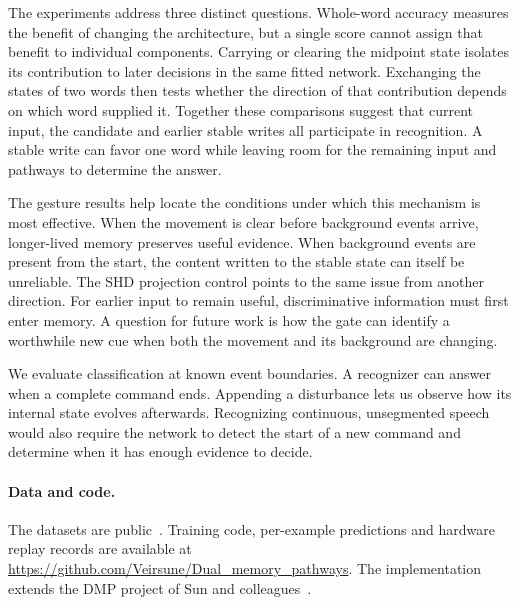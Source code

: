 \documentclass[10pt,twocolumn]{article}
\begin{document}
The experiments address three distinct questions. Whole-word accuracy measures the benefit of changing the architecture, but a single score cannot assign that benefit to individual components. Carrying or clearing the midpoint state isolates its contribution to later decisions in the same fitted network. Exchanging the states of two words then tests whether the direction of that contribution depends on which word supplied it. Together these comparisons suggest that current input, the candidate and earlier stable writes all participate in recognition. A stable write can favor one word while leaving room for the remaining input and pathways to determine the answer.

The gesture results help locate the conditions under which this mechanism is most effective. When the movement is clear before background events arrive, longer-lived memory preserves useful evidence. When background events are present from the start, the content written to the stable state can itself be unreliable. The SHD projection control points to the same issue from another direction. For earlier input to remain useful, discriminative information must first enter memory. A question for future work is how the gate can identify a worthwhile new cue when both the movement and its background are changing.

We evaluate classification at known event boundaries. A recognizer can answer when a complete command ends. Appending a disturbance lets us observe how its internal state evolves afterwards. Recognizing continuous, unsegmented speech would also require the network to detect the start of a new command and determine when it has enough evidence to decide.

\paragraph{Data and code.}
The datasets are public~\cite{shd,gesture,mnist}. Training code, per-example predictions and hardware replay records are available at \url{https://github.com/Veirsune/Dual_memory_pathways}. The implementation extends the DMP project of Sun and colleagues~\cite{dmp}.



\end{document}
